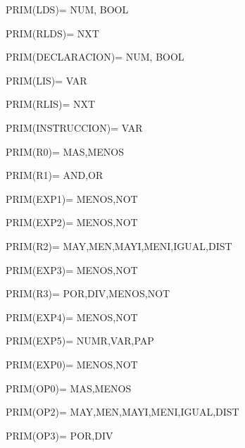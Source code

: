 \documentclass[11pt,oneside,onecolumn,openany,spanish]{book}
\begin{document}
PRIM(LDS)= {NUM, BOOL}

PRIM(RLDS)= {NXT}

PRIM(DECLARACION)= {NUM, BOOL}

PRIM(LIS)= {VAR}

PRIM(RLIS)= {NXT}

PRIM(INSTRUCCION)= {VAR}

PRIM(R0)= {MAS,MENOS}

PRIM(R1)= {AND,OR}

PRIM(EXP1)= {MENOS,NOT}

PRIM(EXP2)= {MENOS,NOT}

PRIM(R2)= {MAY,MEN,MAYI,MENI,IGUAL,DIST}

PRIM(EXP3)= {MENOS,NOT}

PRIM(R3)= {POR,DIV,MENOS,NOT}

PRIM(EXP4)= {MENOS,NOT}

PRIM(EXP5)= {NUMR,VAR,PAP}

PRIM(EXP0)= {MENOS,NOT}

PRIM(OP0)= {MAS,MENOS}

PRIM(OP2)= {MAY,MEN,MAYI,MENI,IGUAL,DIST}

PRIM(OP3)= {POR,DIV}
\end{document}
